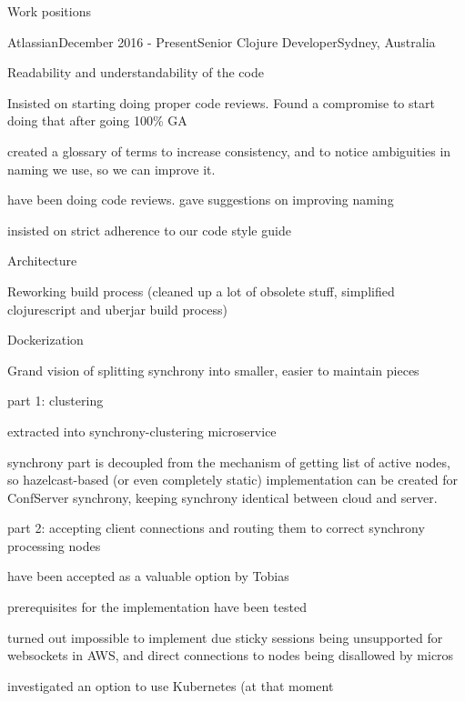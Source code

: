 \documentclass{resume} %
\begin{document}
\begin{rSection}{Work positions}
\begin{rSubsection}{Atlassian}{December 2016 - Present}{Senior Clojure Developer}{Sydney, Australia}
\item Readability and understandability of the code
  \begin{myList}
  \item Insisted on starting doing proper code reviews. Found a
    compromise to start doing that after going 100\% GA
  \item created a glossary of terms to increase consistency, and
    to notice ambiguities in naming we use, so we can improve it.
  \item have been doing code reviews. gave suggestions on improving naming
  \item insisted on strict adherence to our code style guide
  \end{myList}
\item Architecture
  \begin{myList}
  \item Reworking build process (cleaned up a lot of obsolete stuff,
    simplified clojurescript and uberjar build process)
  \item Dockerization
  \item Grand vision of splitting synchrony into smaller, easier to
    maintain pieces
    \begin{myList}
    \item part 1: clustering
      \begin{myList}
      \item extracted into synchrony-clustering microservice
      \item synchrony part is decoupled from the mechanism of getting
        list of active nodes, so hazelcast-based (or even completely
        static) implementation can be created for ConfServer synchrony,
        keeping synchrony identical between cloud and server.
      \end{myList}
    \item part 2: accepting client connections and routing them
      to correct synchrony processing nodes
      \begin{myList}
      \item have been accepted as a valuable option by Tobias
      \item prerequisites for the implementation have been tested
      \item turned out impossible to implement due sticky sessions
        being unsupported for websockets in AWS, and direct connections
        to nodes being disallowed by micros
      \item investigated an option to use Kubernetes (at that moment

\end{myList}
\end{myList}
\end{myList}
\end{rSubsection}
\end{rSection}
\end{document}
